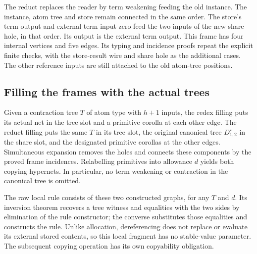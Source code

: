 
The reduct replaces the reader by term weakening feeding the old instance.
The instance, atom tree and store remain connected in the same order. The
store's term output and external term input zero feed the two inputs of the
new share hole, in that order. Its output is the external term output. This
frame has four internal vertices and five edges. Its typing and incidence
proofs repeat the explicit finite checks, with the store-result wire and
share hole as the additional cases. The other reference inputs are still
attached to the old atom-tree positions.





\subsection{Filling the frames with the actual trees}

Given a contraction tree $T$ of atom type with $h+1$ inputs, the redex filling
puts its actual net in the tree slot and a primitive corolla at each other
edge. The reduct filling puts the same $T$ in its tree slot, the original
canonical tree $D^{\star}_{1,2}$ in the share slot, and the designated primitive
corollas at the other edges. Simultaneous expansion removes the holes and
connects these components by the proved frame incidences. Relabelling primitives
into allowance $d$ yields both copying hypernets. In particular, no term
weakening or contraction in the canonical tree is omitted.

The raw local rule consists of these two constructed graphs, for any $T$ and
$d$. Its inversion theorem recovers a tree witness and equalities with the two
sides by elimination of the rule constructor; the converse substitutes those
equalities and constructs the rule. Unlike allocation, dereferencing does not
replace or evaluate its external stored contents, so this local fragment has
no stable-value parameter. The subsequent copying operation has its own
copyability obligation.

